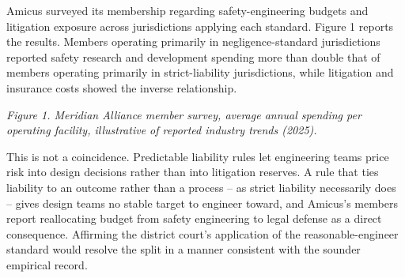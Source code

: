 
Amicus surveyed its membership regarding safety-engineering budgets and litigation exposure across jurisdictions applying each standard. Figure 1 reports the results. Members operating primarily in negligence-standard jurisdictions reported safety research and development spending more than double that of members operating primarily in strict-liability jurisdictions, while litigation and insurance costs showed the inverse relationship.

\begin{center}

\vspace{2pt}
{\footnotesize\textit{Figure 1. Meridian Alliance member survey, average annual spending per operating facility, illustrative of reported industry trends (2025).}}
\end{center}

This is not a coincidence. Predictable liability rules let engineering teams price risk into design decisions rather than into litigation reserves. A rule that ties liability to an outcome rather than a process -- as strict liability necessarily does -- gives design teams no stable target to engineer toward, and Amicus's members report reallocating budget from safety engineering to legal defense as a direct consequence. Affirming the district court's application of the reasonable-engineer standard would resolve the split in a manner consistent with the sounder empirical record.
